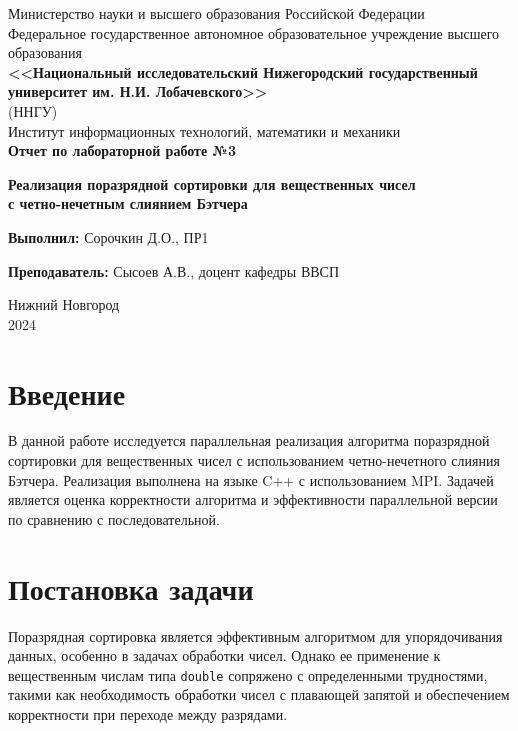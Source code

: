 \documentclass[12pt]{article}
\begin{document}
\begin{titlepage}
\centering
    \large
    Министерство науки и высшего образования Российской Федерации\\[0.5cm]
    Федеральное государственное автономное образовательное учреждение высшего образования\\[0.5cm]
    \textbf{<<Национальный исследовательский Нижегородский государственный университет им. Н.И. Лобачевского>>}\\
    (ННГУ)\\[1cm]
    Институт информационных технологий, математики и механики\\
\vspace*{\fill}
{\Huge \textbf{Отчет по лабораторной работе №3}}

\vspace{0.5cm}
{\Huge \textbf{Реализация поразрядной сортировки для вещественных чисел \\ с четно-нечетным слиянием Бэтчера}}

\vspace{0.5cm}
{\Large \textbf{Выполнил:} Сорочкин Д.О., ПР1} 

\vspace{0.5cm}
{\Large \textbf{Преподаватель:} Сысоев А.В., доцент кафедры ВВСП} 

\vspace*{\fill}

{\large Нижний Новгород\\ 2024}
\end{titlepage}

\newpage
\section*{Введение}

В данной работе исследуется параллельная реализация алгоритма поразрядной сортировки для вещественных чисел с использованием четно-нечетного слияния Бэтчера. Реализация выполнена на языке C++ с использованием MPI. Задачей является оценка корректности алгоритма и эффективности параллельной версии по сравнению с последовательной.

\newpage
\section*{Постановка задачи}
Поразрядная сортировка является эффективным алгоритмом для упорядочивания данных, особенно в задачах обработки чисел. Однако ее применение к вещественным числам типа \texttt{double} сопряжено с определенными трудностями, такими как необходимость обработки чисел с плавающей запятой и обеспечением корректности при переходе между разрядами.
\end{document}
